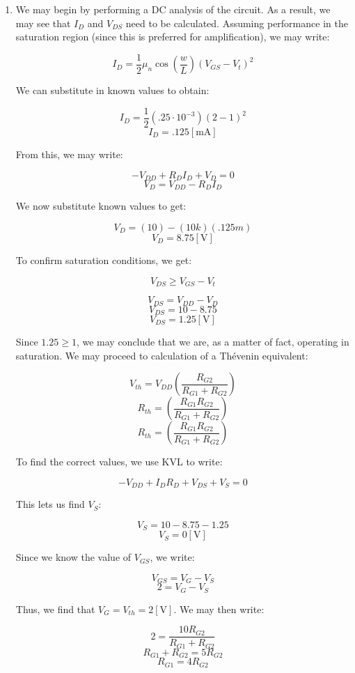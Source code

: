 \begin{enumerate}

  \item We may begin by performing a DC analysis of the circuit. As a result, we may see that $I_D$ and $V_{DS}$ need to be calculated. Assuming performance in the saturation region (since this is preferred for amplification), we may write:

    $$I_D=\frac{1}{2}\mu_n\cos\left( \frac{w}{L} \right)\left( V_{GS}-V_{t} \right)^2$$

    We can substitute in known values to obtain:

    $$I_D=\frac{1}{2}\left( .25\cdot10^{-3} \right)\left( 2-1 \right)^2$$
    $$\boxed{I_D=.125[\si{\milli\ampere}]}$$

    From this, we may write:

    $$-V_{DD}+R_DI_D+V_D=0$$
    $$V_D=V_{DD}-R_DI_D$$

    We now substitute known values to get:

    $$V_D=(10)-(10k)(.125m)$$
    $$\boxed{V_D=8.75[\si{\volt}]}$$

    To confirm saturation conditions, we get:

    $$V_{DS}\geq V_{GS}-V_t$$

    $$V_{DS}=V_{DD}-V_{D}$$
    $$V_{DS}=10-8.75$$
    $$\boxed{V_{DS}=1.25[\si{\volt}]}$$

    Since $1.25\geq 1$, we may conclude that we are, as a matter of fact, operating in saturation. We may proceed to calculation of a Th\'evenin equivalent:

    $$V_{th}=V_{DD}\left( \frac{R_{G2}}{R_{G1}+R_{G2}} \right)$$
    $$R_{th}=\left( \frac{R_{G1}R_{G2}}{R_{G1}+R_{G2}} \right)$$
    $$R_{th}=\left( \frac{R_{G1}R_{G2}}{R_{G1}+R_{G2}} \right)$$

    To find the correct values, we use KVL to write:

    $$-V_{DD}+I_DR_D+V_{DS}+V_{S}=0$$

    This lets us find $V_{S}$:

    $$V_{S}=10-8.75-1.25$$
    $$V_{S}=0[\si{\volt}]$$

    Since we know the value of $V_{GS}$, we write:

    $$V_{GS}=V_G-V_S$$
    $$2=V_G-V_S$$

    Thus, we find that $V_G=V_{th}=2[\si{\volt}]$. We may then write:

    $$2=\frac{10R_{G2}}{R_{G1}+R_{G2}}$$
    $$R_{G1}+R_{G2}=5R_{G2}$$
    $$R_{G1}=4R_{G2}$$


\end{enumerate}
